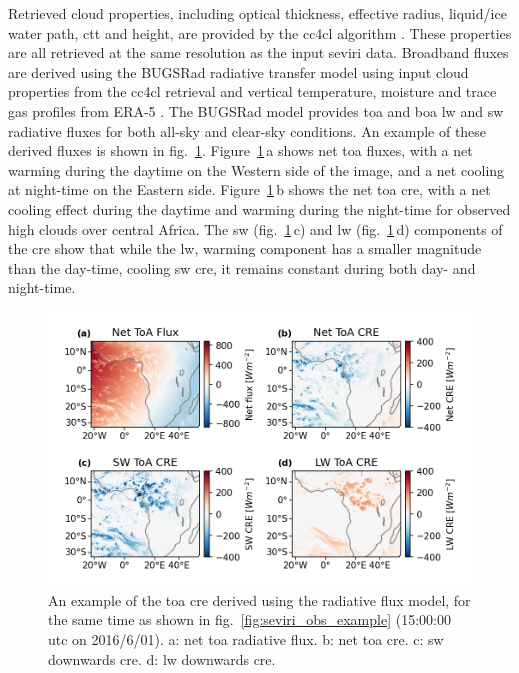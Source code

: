 Retrieved cloud properties, including optical thickness, effective radius, liquid/ice water path, \acrshort{ctt} and height, are provided by the \acrfull{cc4cl} algorithm \citep{sus_community_2018, mcgarragh_community_2018}. 
These properties are all retrieved at the same resolution as the input \acrshort{seviri} data. Broadband fluxes are derived using the BUGSRad radiative transfer model \citep{stephens_parameterization_2001} using input cloud properties from the \acrshort{cc4cl} retrieval and vertical temperature, moisture and trace gas profiles from ERA-5 \citep{hersbach_era5_2020}. 
The BUGSRad model provides \acrshort{toa} and \acrlong{boa} \acrshort{lw} and \acrshort{sw} radiative fluxes for both all-sky and clear-sky conditions. An example of these derived fluxes is shown in fig.~\ref{fig:seviri_flux_example}. 
Figure~\ref{fig:seviri_flux_example}\,a shows net \acrshort{toa} fluxes, with a net warming during the daytime on the Western side of the image, and a net cooling at night-time on the Eastern side. 
Figure~\ref{fig:seviri_flux_example}\,b shows the net \acrshort{toa} \acrshort{cre}, with a net cooling effect during the daytime and warming during the night-time for observed high clouds over central Africa. The \acrshort{sw} (fig.~\ref{fig:seviri_flux_example}\,c) and \acrshort{lw} (fig.~\ref{fig:seviri_flux_example}\,d) components of the \acrshort{cre} show that while the \acrshort{lw},
warming component has a smaller magnitude than the day-time, cooling \acrshort{sw} \acrshort{cre}, it remains constant during both day- and night-time.


\begin{figure}[tp]
    \includegraphics[width=\textwidth]{figures/chapter4_02.png}
    \caption[
    An example of the \acrshort{toa} \acrshort{cre} derived using the radiative flux model
    ]{
    An example of the \acrshort{toa} \acrshort{cre} derived using the radiative flux model, for the same time
    as shown in fig.~\ref{fig:seviri_obs_example} (15:00:00 \acrshort{utc} on 2016/6/01). a: net \acrshort{toa} radiative flux. b: net \acrshort{toa} \acrshort{cre}. c: \acrshort{sw} downwards \acrshort{cre}. d: \acrshort{lw} downwards \acrshort{cre}.
    }
    \label{fig:seviri_flux_example}
\end{figure}


